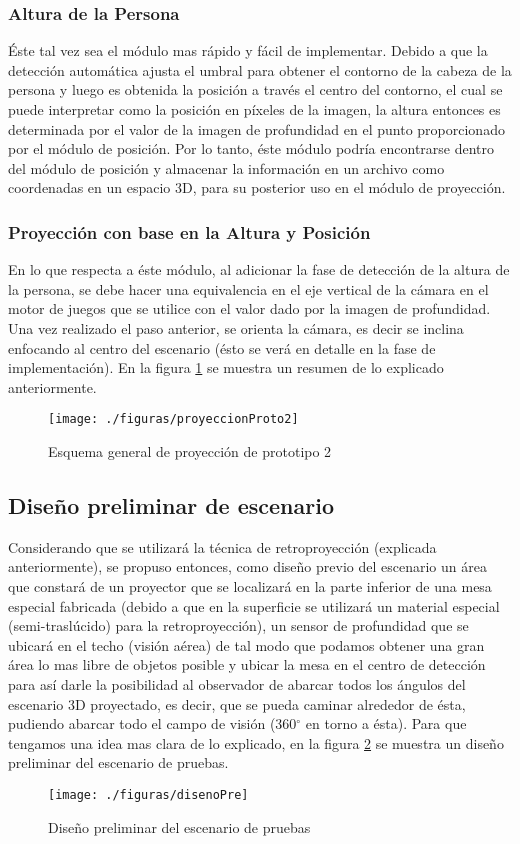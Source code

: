 \documentclass[a4paper,openright,12pt]{report}
\begin{document}
\subsubsection{Altura de la Persona}
Éste tal vez sea el módulo mas rápido y fácil de implementar. Debido a que la detección automática ajusta el umbral para obtener el contorno de la cabeza de la persona y luego es obtenida la posición a través el centro del contorno, el cual se puede interpretar como la posición en píxeles de la imagen, la altura entonces es determinada por el valor de la imagen de profundidad en el punto proporcionado por el módulo de posición. Por lo tanto, éste módulo podría encontrarse dentro del módulo de posición y almacenar la información en un archivo como coordenadas en un espacio 3D, para su posterior uso en el módulo de proyección.
\subsubsection{Proyección con base en la Altura y Posición}
En lo que respecta a éste módulo, al adicionar la fase de detección de la altura de la persona, se debe hacer una equivalencia en el eje vertical de la cámara en el motor de juegos que se utilice con el valor dado por la imagen de profundidad. Una vez realizado el paso anterior, se orienta la cámara, es decir se inclina enfocando al centro del escenario (ésto se verá en detalle en la fase de implementación). En la figura \ref{fig:proyeccionProto2} se muestra un resumen de lo explicado anteriormente.
\begin{figure}[th]
	\centering
	\texttt{[image: ./figuras/proyeccionProto2]}
	\caption{Esquema general de proyección de prototipo 2} \label{fig:proyeccionProto2}
\end{figure}
\subsection{Diseño preliminar de escenario}
Considerando que se utilizará la técnica de retroproyección (explicada anteriormente), se propuso entonces, como diseño previo del escenario un área que constará de un proyector que se localizará en la parte inferior de una mesa especial fabricada (debido a que en la superficie se utilizará un material especial (semi-traslúcido) para la retroproyección), un sensor de profundidad que se ubicará en el techo (visión aérea) de tal modo que podamos obtener una gran área lo mas libre de objetos posible y ubicar la mesa en el centro de detección para así darle la posibilidad al observador de abarcar todos los ángulos del escenario 3D proyectado, es decir, que se pueda caminar alrededor de ésta, pudiendo abarcar todo el campo de visión (360$^{\circ}$ en torno a ésta). Para que tengamos una idea mas clara de lo explicado, en la figura \ref{fig:disenoPre}  se muestra un diseño preliminar del escenario de pruebas.
\begin{figure}[th]
	\centering
	\texttt{[image: ./figuras/disenoPre]}
	\caption{Diseño preliminar del escenario de pruebas} \label{fig:disenoPre}
\end{figure}
\end{document}

